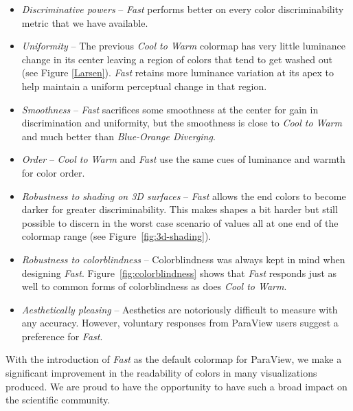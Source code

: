 \documentclass{IEEEcsmag}
\newcommand*{\colormap}[1]{\textsl{#1}\xspace}
\newcommand*{\coolwarm}{\colormap{Cool to Warm}}
\newcommand*{\blueorange}{\colormap{Blue-Orange Diverging}}
\newcommand*{\fast}{\colormap{Fast}}
\begin{document}
\begin{itemize}

\item \emph{Discriminative powers} --
  \fast performs better on every color discriminability metric that we have available.
\item \emph{Uniformity} --
  The previous \coolwarm colormap has very little luminance change in its center leaving a region of colors that tend to get washed out (see Figure \ref{Larsen}).
  \fast retains more luminance variation at its apex to help maintain a uniform perceptual change in that region.
\item \emph{Smoothness} --
  \fast sacrifices some smoothness at the center for gain in discrimination and uniformity, but the smoothness is close to \coolwarm and much better than \blueorange.
\item \emph{Order} --
  \coolwarm and \fast use the same cues of luminance and warmth for color order.
\item \emph{Robustness to shading on 3D surfaces} --
  \fast allows the end colors to become darker for greater discriminability.
  This makes shapes a bit harder but still possible to discern in the worst case scenario of values all at one end of the colormap range (see Figure~\ref{fig:3d-shading}).
\item \emph{Robustness to colorblindness} --
  Colorblindness was always kept in mind when designing \fast.
  Figure~\ref{fig:colorblindness} shows that \fast responds just as well to common forms of colorblindness as does \coolwarm.
\item \emph{Aesthetically pleasing} --
  Aesthetics are notoriously difficult to measure with any accuracy.
  However, voluntary responses from ParaView users suggest a preference for \fast.

\end{itemize}



With the introduction of \fast as the default colormap for ParaView, we make a significant improvement in the readability of colors in many visualizations produced. We are proud to have the opportunity to have such a broad impact on the scientific community.
\end{document}
